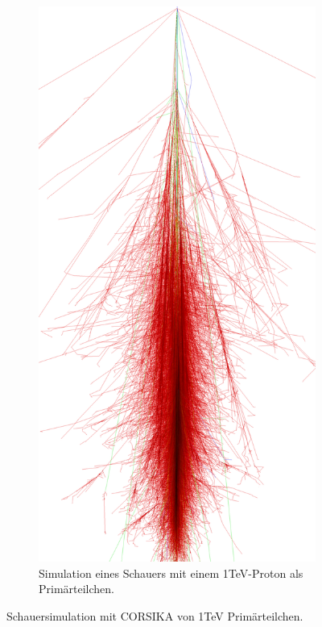 \begin{figure}
\begin{subfigure}{0.4\textwidth}
 \end{subfigure}
 \hspace{2.0cm}
  \begin{subfigure}{0.4\textwidth}
  \includegraphics[width=\textwidth]{./Plots/03_MonteCarlos/Proton_1TeV_CORSIKA.png}
  \caption{Simulation eines Schauers mit einem 1TeV-Proton als Primärteilchen.}
 \end{subfigure}
  \caption{ Schauersimulation mit CORSIKA von 1TeV Primärteilchen.\cite{CORSIKA-Bilder}}
  \label{CORSIKA_Schauer}
 \end{figure}




